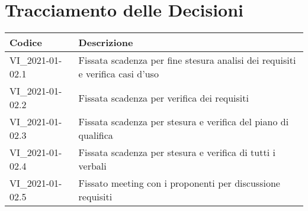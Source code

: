 \section*{Tracciamento delle Decisioni}

\begin{center}
	\begin{longtable}{|p{3.5cm}|p{11cm}|}
		\hline
		\rowcolor{lighter-grayer}
		\textbf{Codice} & \textbf{Descrizione} \\
		\hline
		\endfirsthead

		\hline
		VI\_2021-01-02.1 & Fissata scadenza per fine stesura analisi dei requisiti e verifica casi d'uso \\
		VI\_2021-01-02.2 & Fissata scadenza per verifica dei requisiti \\
		VI\_2021-01-02.3 & Fissata scadenza per stesura e verifica del piano di qualifica \\
		VI\_2021-01-02.4 & Fissata scadenza per stesura e verifica di tutti i verbali \\
		VI\_2021-01-02.5 & Fissato meeting con i proponenti per discussione requisiti \\
		\hline
	\end{longtable}
\end{center}